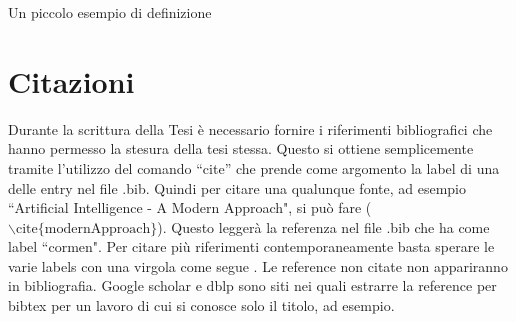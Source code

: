 \begin{defn}
Un piccolo esempio di definizione
\end{defn}

\begin{table}[ht]
	\centering
	\vspace*{2mm}
	\caption{Esempio di tabella}
	\label{tab:perf}
\end{table}


\section{Citazioni}
Durante la scrittura della Tesi è necessario fornire i riferimenti bibliografici che hanno permesso la stesura della tesi stessa.
Questo si ottiene semplicemente tramite l'utilizzo del comando ``cite'' che prende come argomento la label di una delle entry nel file .bib.
Quindi per citare una qualunque fonte, ad esempio ``Artificial Intelligence - A Modern Approach", si può fare \cite{modernApproach} ($\backslash\text{cite}\{\text{modernApproach}\}$).
Questo leggerà la referenza nel file .bib che ha come label ``cormen".
Per citare più riferimenti contemporaneamente basta sperare le varie labels con una virgola come segue \cite{gelfond1998action,modernApproach,durfee1999distributed,de2003resource,allen2009complexity,bernstein2002complexity}.
Le reference non citate non appariranno in bibliografia.
Google scholar e dblp sono siti nei quali estrarre la reference per bibtex per un lavoro di cui si conosce solo il titolo, ad esempio.